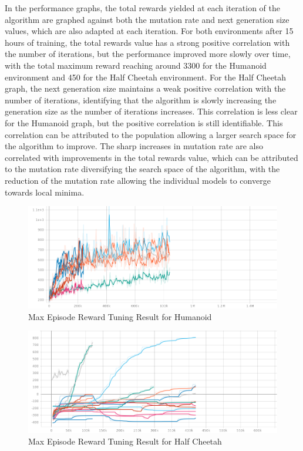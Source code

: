 \documentclass{article}
\begin{document}
    In the performance graphs, the total rewards yielded at each iteration of the algorithm are graphed against both the mutation rate and next generation size values, which are also adapted at each iteration. For both environments after 15 hours of training, the total rewards value has a strong positive correlation with the number of iterations, but the performance improved more slowly over time, with the total maximum reward reaching around 3300 for the Humanoid environment and 450 for the Half Cheetah environment. For the Half Cheetah graph, the next generation size maintains a weak positive correlation with the number of iterations, identifying that the algorithm is slowly increasing the generation size as the number of iterations increases. This correlation is less clear for the Humanoid graph, but the positive correlation is still identifiable. This correlation can be attributed to the population allowing a larger search space for the algorithm to improve. The sharp increases in mutation rate are also correlated with improvements in the total rewards value, which can be attributed to the mutation rate diversifying the search space of the algorithm, with the reduction of the mutation rate allowing the individual models to converge towards local minima.
    
\begin{figure}
    \centerline{\includegraphics[scale=0.5]{humanoid_tuner_reward_max.png}}        
    \caption{Max Episode Reward Tuning Result for Humanoid}
    \label{fig:rlHumanoid}
\end{figure}
\begin{figure}
    \centerline{\includegraphics[scale=0.5]{halfcheetah_tune_episode_reward_max.png}}        
    \caption{Max Episode Reward Tuning Result for Half Cheetah}
    \label{fig:rlHalfCheetah}
\end{figure}
\end{document}
